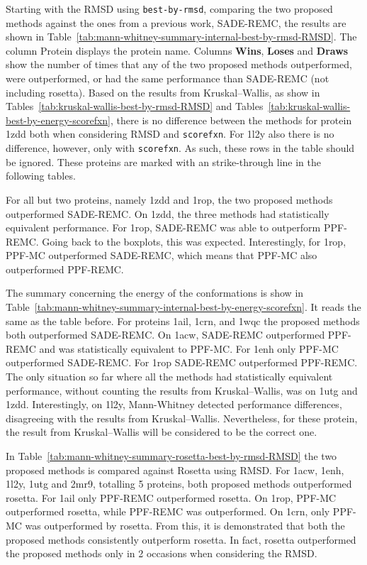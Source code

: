 Starting with the RMSD using \texttt{best-by-rmsd}, comparing the two proposed
methods against the ones from a previous work, SADE-REMC, the results are shown in
Table~\ref{tab:mann-whitney-summary-internal-best-by-rmsd-RMSD}. The column
Protein displays the protein name.
Columns \textbf{Wins}, \textbf{Loses} and \textbf{Draws} show the number of
times that any of the two proposed methods outperformed, were outperformed,
or had the same performance than SADE-REMC (not including rosetta).
Based on the results from Kruskal–Wallis, as show in
Tables~\ref{tab:kruskal-wallis-best-by-rmsd-RMSD} and
Tables~\ref{tab:kruskal-wallis-best-by-energy-scorefxn}, there is no
difference between the methods for protein 1zdd both when considering RMSD and
\texttt{scorefxn}. For 1l2y also there is no difference, however, only with
\texttt{scorefxn}. As such, these rows in the table should be ignored.
These proteins are marked with an strike-through line in the following tables.

For all but two proteins, namely 1zdd and 1rop, the two proposed methods outperformed SADE-REMC.
On 1zdd, the three methods had statistically equivalent performance. For
1rop, SADE-REMC was able to outperform PPF-REMC. Going back to the boxplots,
this was expected. Interestingly, for 1rop, PPF-MC outperformed SADE-REMC, which means
that PPF-MC also outperformed PPF-REMC.

The summary concerning the energy of the conformations is show in
Table~\ref{tab:mann-whitney-summary-internal-best-by-energy-scorefxn}. It
reads the same as the table before.
For proteins 1ail, 1crn, and 1wqc the proposed methods both outperformed
SADE-REMC. On 1acw, SADE-REMC outperformed PPF-REMC and was statistically
equivalent to PPF-MC. For 1enh only PPF-MC outperformed SADE-REMC. For 1rop
SADE-REMC outperformed PPF-REMC. The only situation so far where all the
methods had statistically equivalent performance, without counting the results
from Kruskal–Wallis, was on 1utg and 1zdd.
Interestingly, on 1l2y, Mann-Whitney detected performance differences, disagreeing with
the results from Kruskal–Wallis. Nevertheless, for these protein, the result
from Kruskal–Wallis will be considered to be the correct one.



In Table~\ref{tab:mann-whitney-summary-rosetta-best-by-rmsd-RMSD} the
two proposed methods is compared against Rosetta using RMSD. For 1acw, 1enh, 1l2y, 1utg and 2mr9, totalling 5 proteins, both
proposed methods outperformed rosetta. For 1ail only PPF-REMC
outperformed rosetta. On 1rop, PPF-MC outperformed rosetta, while
PPF-REMC was outperformed. On 1crn, only PPF-MC was outperformed
by rosetta. From this, it is demonstrated that both the proposed methods
consistently outperform rosetta. In fact, rosetta outperformed the proposed
methods only in 2 occasions when considering the RMSD.

